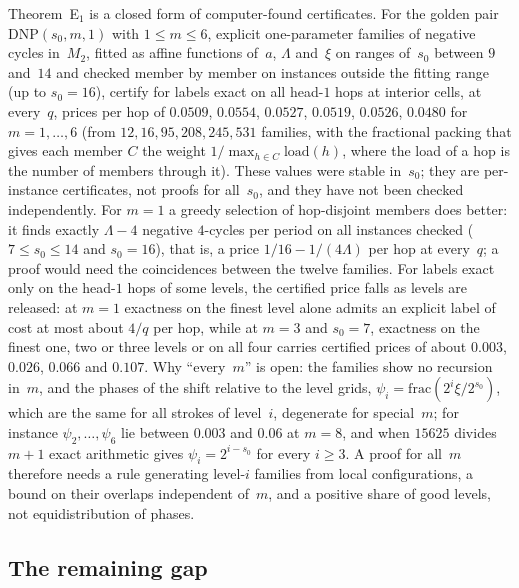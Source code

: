 \begin{remark}\label{rem:dep-Em}
Theorem~E$_1$ is a closed form of computer-found certificates. For the golden pair $\mathrm{DNP}(s_0,m,1)$ with $1\le
m\le6$, explicit one-parameter families of negative cycles in~$M_2$, fitted as affine functions of~$a$, $\Lambda$
and~$\xi$ on ranges of~$s_0$ between $9$ and~$14$ and checked member by member on instances outside the fitting range
(up to $s_0=16$), certify for labels exact on all head-$1$ hops at interior cells, at every~$q$, prices per hop of
$0.0509$, $0.0554$, $0.0527$, $0.0519$, $0.0526$, $0.0480$ for $m=1,\dots,6$ (from $12,16,95,208,245,531$ families,
with the fractional packing that gives each member $C$ the weight $1/\max_{h\in C}\mathrm{load}(h)$, where the load of a
hop is the number of members through it). These values were stable in~$s_0$; they are per-instance certificates, not proofs
for all~$s_0$, and they have not been checked independently. For $m=1$ a greedy selection of hop-disjoint
members does better: it finds exactly $\Lambda-4$ negative $4$-cycles per period on all instances checked ($7\le s_0\le14$
and $s_0=16$), that is, a price $1/16-1/(4\Lambda)$ per hop at every~$q$; a proof would need the coincidences between the
twelve families. For labels exact only on
the head-$1$ hops of some levels, the certified price falls as levels are released: at $m=1$ exactness on the finest
level alone admits an explicit label of cost at most about $4/q$ per hop, while at $m=3$ and $s_0=7$, exactness on the
finest one, two or three levels or on all four carries certified prices of about $0.003$, $0.026$, $0.066$ and
$0.107$. Why ``every~$m$'' is open: the families show no recursion in~$m$, and the phases of the shift relative to the
level grids, $\psi_i=\mathrm{frac}(2^i\xi/2^{s_0})$, which are the same for all strokes of level~$i$, degenerate for
special~$m$; for instance $\psi_2,\dots,\psi_6$ lie between $0.003$ and $0.06$ at $m=8$, and when $15625$ divides
$m+1$ exact arithmetic gives $\psi_i=2^{i-s_0}$ for every $i\ge3$. A proof for all~$m$ therefore needs a rule
generating level-$i$ families from local configurations, a bound on their overlaps independent of~$m$, and a positive
share of good levels, not equidistribution of phases.
\end{remark}

\subsection{The remaining gap}\label{sec:dep-gap}


